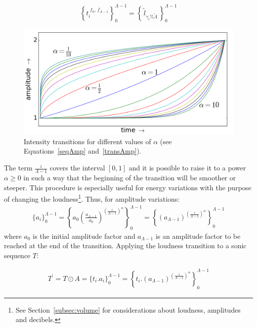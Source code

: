 \begin{equation}\label{serieAmostralLog}
 \left\{t_i^{\;\overline{f_0,\,f_{\Lambda-1}}}\right\}_0^{\Lambda-1}=\left\{\,\widetilde{l}_{\gamma_i \% \widetilde{\Lambda}}\,\right\}_0^{\Lambda-1}
\end{equation}

\begin{figure}[h!]
     \centering
         \includegraphics[width=.7\columnwidth]{figures/transicao_}
     \caption{Intensity transitions for different values of $\alpha$ (see Equations~\ref{seqAmp} and~\ref{transAmp}).}
         \label{fig:transicao}
\end{figure}

The term $\frac{i}{\Lambda-1}$ covers the interval $[0,1]$ and it is possible to raise it to a power $\alpha\geq0$ in such a way that the beginning of the transition will be smoother or steeper.
This procedure is especially useful for energy variations with the purpose of changing the loudness\footnote{See Section~\ref{subsec:volume} for considerations about loudness, amplitudes and decibels.}.
Thus, for amplitude variations:
\begin{equation}\label{seqAmp}
\begin{split}
 \{a_i\}_0^{\Lambda-1}= \left \{ a_0 \left ( \frac{a_{\Lambda-1}}{a_0} \right )^{\left ( \frac{i}{\Lambda-1} \right )^\alpha} \right \}_0^{\Lambda-1}= \left \{ \left ( {a_{\Lambda-1}} \right )^{\left ( \frac{i}{\Lambda-1} \right )^\alpha} \right \}_0^{\Lambda-1}
\end{split}
\end{equation}
where $a_0$ is the initial amplitude factor and
$a_{\Lambda-1}$ is an amplitude factor to be reached at the end of the transition.
Applying the loudness transition to a sonic sequence $T$:

\begin{equation}\label{transAmp}
\begin{split}
 T^{'}=T \odot A = \{t_i . a_i\}_0^{\Lambda-1} = \left \{ t_i . (a_{\Lambda-1} )^{\left ( \frac{i}{\Lambda-1} \right )^\alpha} \right \}_0^{\Lambda-1}
\end{split}
\end{equation}

